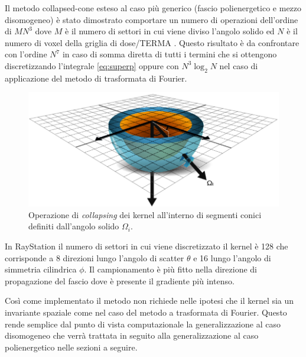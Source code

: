 {Il metodo collapsed-cone esteso al caso più generico (fascio polienergetico e mezzo disomogeneo) è stato dimostrato comportare un numero di operazioni dell'ordine di $MN^3$ dove $M$ è il numero di settori in cui viene diviso l'angolo solido ed $N$ è il numero di voxel della griglia di dose/TERMA \cite{Ahnesjo1989}. Questo risultato è da confrontare con l'ordine $N^7$ in caso di somma diretta di tutti i termini che si ottengono discretizzando l'integrale \eqref{eq:superp} oppure con $N^3\log_2N$ nel caso di applicazione del metodo di trasformata di Fourier.

\begin{figure}
\centering
\includegraphics[width=\textwidth]{./cap1/kern_collaps.png}
\caption{Operazione di \textit{collapsing} dei kernel all'interno di segmenti conici definiti dall'angolo solido $\Omega_i$.}
\label{fig:kern_collaps}
\end{figure}

In RayStation il numero di settori in cui viene discretizzato il kernel è 128 che corrisponde a 8 direzioni lungo l'angolo di scatter $\theta$ e 16 lungo l'angolo di simmetria cilindrica $\phi$. Il campionamento è più fitto nella direzione di propagazione del fascio dove è presente il gradiente più intenso.

Così come implementato il metodo non richiede nelle ipotesi che il kernel sia un invariante spaziale come nel caso del metodo a trasformata di Fourier. Questo rende semplice dal punto di vista computazionale  la generalizzazione al caso disomogeneo che verrà trattata in seguito alla generalizzazione al caso polienergetico nelle sezioni a seguire.

}

